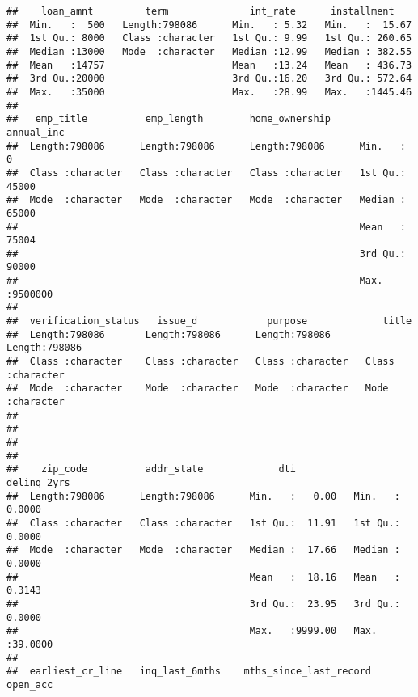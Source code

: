 \documentclass[
]{article}
\begin{document}
\begin{verbatim}
##    loan_amnt         term              int_rate      installment     
##  Min.   :  500   Length:798086      Min.   : 5.32   Min.   :  15.67  
##  1st Qu.: 8000   Class :character   1st Qu.: 9.99   1st Qu.: 260.65  
##  Median :13000   Mode  :character   Median :12.99   Median : 382.55  
##  Mean   :14757                      Mean   :13.24   Mean   : 436.73  
##  3rd Qu.:20000                      3rd Qu.:16.20   3rd Qu.: 572.64  
##  Max.   :35000                      Max.   :28.99   Max.   :1445.46  
##                                                                      
##   emp_title          emp_length        home_ownership       annual_inc     
##  Length:798086      Length:798086      Length:798086      Min.   :      0  
##  Class :character   Class :character   Class :character   1st Qu.:  45000  
##  Mode  :character   Mode  :character   Mode  :character   Median :  65000  
##                                                           Mean   :  75004  
##                                                           3rd Qu.:  90000  
##                                                           Max.   :9500000  
##                                                                            
##  verification_status   issue_d            purpose             title          
##  Length:798086       Length:798086      Length:798086      Length:798086     
##  Class :character    Class :character   Class :character   Class :character  
##  Mode  :character    Mode  :character   Mode  :character   Mode  :character  
##                                                                              
##                                                                              
##                                                                              
##                                                                              
##    zip_code          addr_state             dti           delinq_2yrs     
##  Length:798086      Length:798086      Min.   :   0.00   Min.   : 0.0000  
##  Class :character   Class :character   1st Qu.:  11.91   1st Qu.: 0.0000  
##  Mode  :character   Mode  :character   Median :  17.66   Median : 0.0000  
##                                        Mean   :  18.16   Mean   : 0.3143  
##                                        3rd Qu.:  23.95   3rd Qu.: 0.0000  
##                                        Max.   :9999.00   Max.   :39.0000  
##                                                                           
##  earliest_cr_line   inq_last_6mths    mths_since_last_record    open_acc    

\end{verbatim}
\end{document}
